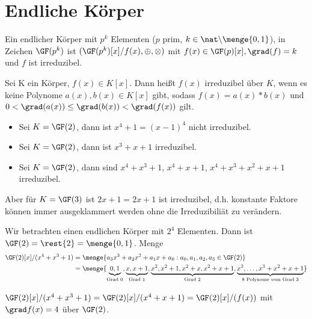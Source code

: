 \section{Endliche Körper}

\begin{defin}
	Ein endlicher Körper mit $p^k$ Elementen ($p$ prim, $k \in \nat \backslash \menge{0,1}$), in Zeichen $\GF(p^k)$ ist $(\GF(p^k)[x] / f(x) , \oplus, \otimes)$ mit $f(x) \in \GF(p)[x], \grad(f) = k$ und $f$ ist irreduzibel.
\end{defin}

\begin{defin}
	Sei K ein Körper, $f(x) \in K[x]$. Dann heißt $f(x)$ irreduzibel über $K$, wenn es keine Polynome $a(x), b(x) \in K[x]$ gibt, sodass $f(x)=a(x) * b(x)$ und $0 < \grad(a(x)) \leq \grad(b(x)) < \grad(f(x))$ gilt.
\end{defin}

\begin{bsp}
	\begin{itemize}
		\item Sei $K = \GF(2)$, dann ist $x^4+1 = (x-1)^4$ nicht irreduzibel.
		\item Sei $K = \GF(2)$, dann ist $x^3 + x + 1$ irreduzibel.
		\item Sei $K = \GF(2)$, dann sind $x^4+x^3+1$, $x^4+x+1$, $x^4+x^3+x^2+x+1$ irreduzibel.
	\end{itemize}
\end{bsp}

\begin{bem}
	Aber für $K = \GF(3)$ ist $2x+1 = 2x + 1$ ist irreduzibel, d.h. konstante Faktore können immer ausgeklammert werden ohne die Irreduzibiliät zu verändern.
\end{bem}

\begin{bsp}
	Wir betrachten einen endlichen Körper mit $2^4$ Elementen. Dann ist $\GF(2) = \rest{2} = \menge{0,1}$. 
	Menge
	\begin{align*}
	\GF(2)[x] / (x^4+x^3+1) 
	&= \menge{a_3x^3 + a_2x^2 + a_1x + a_0 : a_0, a_1, a_2, a_3 \in \GF(2)} \\
	&= \menge{ \underbrace{0,1}_{\text{Grad 0}}, \underbrace{x,x+1}_{\text{Grad 1}}, \underbrace{x^2, x^2 + 1, x^2 + x, x^2+x+1}_{\text{Grad 2}}, \underbrace{x^3, \dots, x^3+x^2+x+1}_{\text{8 Polynome vom Grad 3}}}
	\end{align*}
\end{bsp}

\begin{bem}
	$\GF(2)[x] / (x^4+x^3+1) = \GF(2)[x] / (x^4+x+1) = \GF(2) [x] / (f(x))$ mit $\grad f(x) = 4$ über $\GF(2)$.
\end{bem}

